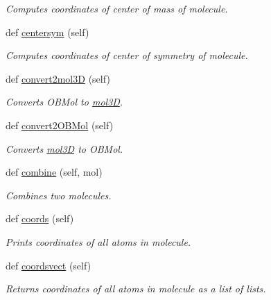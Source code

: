 \begin{DoxyCompactItemize}
\begin{DoxyCompactList}\small\item\em Computes coordinates of center of mass of molecule. \end{DoxyCompactList}\item 
def \hyperlink{classmolSimplify_1_1Classes_1_1mol3D_1_1mol3D_a0e4c145ac4c16e7be70cec1a3e03f6b7}{centersym} (self)
\begin{DoxyCompactList}\small\item\em Computes coordinates of center of symmetry of molecule. \end{DoxyCompactList}\item 
def \hyperlink{classmolSimplify_1_1Classes_1_1mol3D_1_1mol3D_a10ce42207cd8291c685640438f8de1a8}{convert2mol3D} (self)
\begin{DoxyCompactList}\small\item\em Converts O\+B\+Mol to \hyperlink{classmolSimplify_1_1Classes_1_1mol3D_1_1mol3D}{mol3D}. \end{DoxyCompactList}\item 
def \hyperlink{classmolSimplify_1_1Classes_1_1mol3D_1_1mol3D_acc86e8896c87c6287cfe504321ec8b11}{convert2\+O\+B\+Mol} (self)
\begin{DoxyCompactList}\small\item\em Converts \hyperlink{classmolSimplify_1_1Classes_1_1mol3D_1_1mol3D}{mol3D} to O\+B\+Mol. \end{DoxyCompactList}\item 
def \hyperlink{classmolSimplify_1_1Classes_1_1mol3D_1_1mol3D_a8c96247d4d06ac9d1b241af45e79d94a}{combine} (self, mol)
\begin{DoxyCompactList}\small\item\em Combines two molecules. \end{DoxyCompactList}\item 
def \hyperlink{classmolSimplify_1_1Classes_1_1mol3D_1_1mol3D_a551393e5c2417086b3b7855be3cf5957}{coords} (self)
\begin{DoxyCompactList}\small\item\em Prints coordinates of all atoms in molecule. \end{DoxyCompactList}\item 
def \hyperlink{classmolSimplify_1_1Classes_1_1mol3D_1_1mol3D_a305748724bd9be10c324302f046e3815}{coordsvect} (self)
\begin{DoxyCompactList}\small\item\em Returns coordinates of all atoms in molecule as a list of lists. \end{DoxyCompactList}\item 

\end{DoxyCompactItemize}

